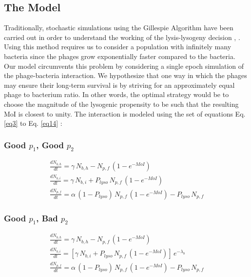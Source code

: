 \documentclass[12pt,letterpaper]{article}
\begin{document}
\subsection*{The Model}
Traditionally, stochastic simulations using the Gillespie Algorithm \cite{gillespie1977exact} have been carried out in order to understand the working of the lysis-lysogeny decision \cite{cao2010probability}, \cite{trinh2017cell}. Using this method requires us to consider a population with infinitely many bacteria since the phages grow exponentially faster compared to the bacteria. \\

Our model circumvents this problem by considering a single epoch simulation of the phage-bacteria interaction. We hypothesize that one way in which the phages may ensure their long-term survival is by striving for an approximately equal phage to bacterium ratio. In other words, the optimal strategy would be to choose the magnitude of the lysogenic propensity to be such that the resulting MoI is closest to unity. The interaction is modeled using the set of equations Eq. \ref{eq3} to Eq. \ref{eq14} :

\newpage

\subsubsection*{Good $p_1$, Good $p_2$}
\begin{gather}
\frac{dN_{b,h}}{dt} = \gamma\,N_{b,h} - N_{p,f}\,(1-e^{-MoI}) \label{eq3} \\
\frac{dN_{b,i}}{dt} = \gamma\,N_{b,i} + P_{lyso}\,N_{p,f}\,(1-e^{-MoI}) \label{eq4} \\
\frac{dN_{p,f}}{dt} = \alpha\,(1-P_{lyso})\,N_{p,f}\,(1-e^{-MoI}) - P_{lyso}\,N_{p,f} \label{eq5}
\end{gather}

\subsubsection*{Good $p_1$, Bad $p_2$}
\begin{gather}
\frac{dN_{b,h}}{dt} = \gamma\,N_{b,h} - N_{p,f}\,(1-e^{-MoI}) \label{eq6} \\
\frac{dN_{b,i}}{dt} = [\gamma\,N_{b,i} + P_{lyso}\,N_{p,f}\,(1-e^{-MoI})]\,e^{-\lambda_b} \label{eq7} \\
\frac{dN_{p,f}}{dt} = \alpha\,(1-P_{lyso})\,N_{p,f}\,(1-e^{-MoI}) - P_{lyso}\,N_{p,f} \label{8}
\end{gather}
\end{document}
